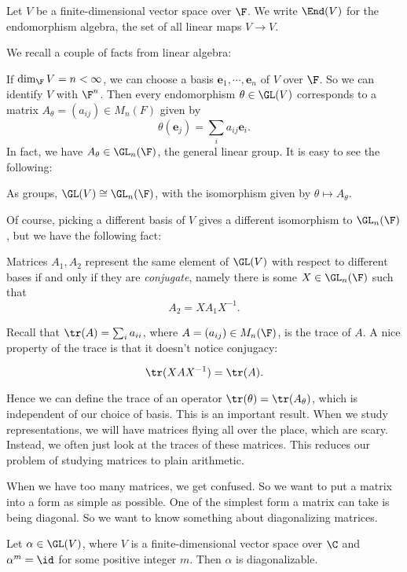\documentclass[a4paper]{article}
\begin{document}
\begin{notation}
  Let $V$ be a finite-dimensional vector space over $\F$. We write $\End(V)$ for the endomorphism algebra, the set of all linear maps $V \to V$.
\end{notation}

We recall a couple of facts from linear algebra:

If $\dim_\F V = n < \infty$, we can choose a basis $\mathbf{e}_1, \cdots, \mathbf{e}_n$ of $V$ over $\F$. So we can identify $V$ with $\F^n$. Then every endomorphism $\theta \in \GL(V)$ corresponds to a matrix $A_\theta = (a_{ij}) \in M_n(F)$ given by
\[
  \theta(\mathbf{e}_j) = \sum_i a_{ij} \mathbf{e}_i.
\]
In fact, we have $A_\theta \in \GL_n(\F)$, the general linear group. It is easy to see the following:
\begin{prop}
  As groups, $\GL(V) \cong \GL_n(\F)$, with the isomorphism given by $\theta \mapsto A_\theta$.
\end{prop}

Of course, picking a different basis of $V$ gives a different isomorphism to $\GL_n(\F)$, but we have the following fact:
\begin{prop}
  Matrices $A_1, A_2$ represent the same element of $\GL(V)$ with respect to different bases if and only if they are \emph{conjugate}, namely there is some $X \in \GL_n(\F)$ such that
  \[
    A_2 = XA_1 X^{-1}.
  \]
\end{prop}

Recall that $\tr(A) = \sum_i a_{ii}$, where $A = (a_{ij}) \in M_n(\F)$, is the trace of $A$. A nice property of the trace is that it doesn't notice conjugacy:
\begin{prop}
  \[
    \tr(XAX^{-1}) = \tr (A).
  \]
\end{prop}

Hence we can define the trace of an operator $\tr(\theta) = \tr(A_\theta)$, which is independent of our choice of basis. This is an important result. When we study representations, we will have matrices flying all over the place, which are scary. Instead, we often just look at the traces of these matrices. This reduces our problem of studying matrices to plain arithmetic.

When we have too many matrices, we get confused. So we want to put a matrix into a form as simple as possible. One of the simplest form a matrix can take is being diagonal. So we want to know something about diagonalizing matrices.

\begin{prop}
  Let $\alpha \in \GL(V)$, where $V$ is a finite-dimensional vector space over $\C$ and $\alpha^m = \id$ for some positive integer $m$. Then $\alpha$ is diagonalizable.
\end{prop}
\end{document}
